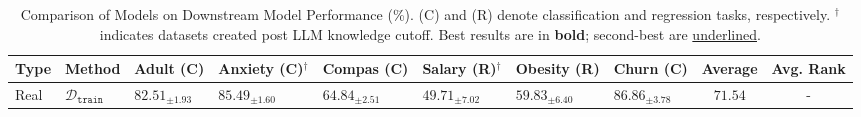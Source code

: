 \begin{table}[ht]

    \small
    \centering
    \setlength{\tabcolsep}{1mm}
    \caption{Comparison of Models on Downstream Model Performance (\%). (C) and (R) denote classification and regression tasks, respectively. $^\dag$ indicates datasets created post LLM knowledge cutoff. Best results are in \textbf{bold}; second-best are \underline{underlined}.}
    \begin{tabular}{ll|llllll|c|c}
    \toprule
    
    \textbf{Type} & \textbf{Method} & 
    \multicolumn{1}{c}{\textbf{Adult (C)}} & 
    \multicolumn{1}{c}{\textbf{Anxiety (C)$^\dag$}} & 
    \multicolumn{1}{c}{\textbf{Compas (C)}} & 
    \multicolumn{1}{c}{\textbf{Salary (R)$^\dag$}} & 
    \multicolumn{1}{c}{\textbf{Obesity (R)}} & 
    \multicolumn{1}{c}{\textbf{Churn (C)}} & 
    \textbf{Average} & \textbf{Avg. Rank} \\
    \midrule
    \multirow{1}{*}{Real} & $\mathcal{D}_\mathtt{train}$ & $82.51_{\pm 1.93}$ & $85.49_{\pm 1.60}$ & $64.84_{\pm 2.51}$ & $49.71_{\pm 7.02}$ & $59.83_{\pm 6.40}$ & $86.86_{\pm 3.78}$ & $71.54$ & - \\
    

\end{tabular}
\end{table}
